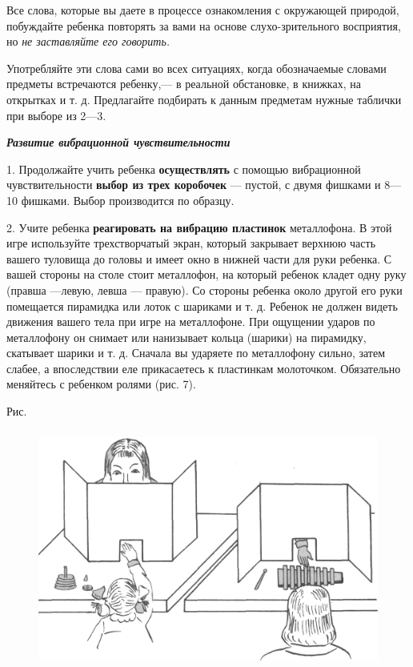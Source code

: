 \documentclass[a5paper]{book}
\renewcommand{\emph}[1]{\textit{#1}}
\begin{document}
Все слова, которые вы даете в процессе ознакомления с окружающей
природой, побуждайте ребенка повторять за вами на основе
слухо-зрительного восприятия, но \emph{не заставляйте его говорить.}

Употребляйте эти слова сами во всех ситуациях, когда обозначаемые
словами предметы встречаются ребенку,--- в реальной обстановке, в
книжках, на открытках и т. д. Предлагайте подбирать к данным предметам
нужные таблички при выборе из 2---3.

\emph{\textbf{Развитие вибрационной чувствительности}}

1. Продолжайте учить ребенка \textbf{осуществлять} с помощью
вибрационной чувствительности \textbf{выбор из трех коробочек} ---
пустой, с двумя фишками и 8---10 фишками. Выбор производится по образцу.

2. Учите ребенка \textbf{реагировать на вибрацию пластинок} металлофона.
В этой игре используйте трехстворчатый экран, который закрывает верхнюю
часть вашего туловища до головы и имеет окно в нижней части для руки
ребенка. С вашей стороны на столе стоит металлофон, на который ребенок
кладет одну руку (правша ---левую, левша --- правую). Со стороны ребенка
около другой его руки помещается пирамидка или лоток с шариками и т. д.
Ребенок не должен видеть движения вашего тела при игре на металлофоне.
При ощущении ударов по металлофону он снимает или нанизывает кольца
(шарики) на пирамидку, скатывает шарики и т. д. Сначала вы ударяете по
металлофону сильно, затем слабее, а впоследствии еле прикасаетесь к
пластинкам молоточком. Обязательно меняйтесь с ребенком ролями (рис. 7).

Рис.
\begin{figure}
\includegraphics[width=4.66667in,height=3.07361in]{media/media/image7.jpg}
\end{figure}
\end{document}
